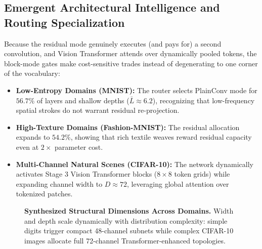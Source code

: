 \documentclass[11pt, a4paper]{article}
\begin{document}
\subsection{Emergent Architectural Intelligence and Routing Specialization}
\label{sec:emergent_intel}

Because the residual mode genuinely executes (and pays for) a second convolution, and Vision Transformer attends over dynamically pooled tokens, the block-mode gates make cost-sensitive trades instead of degenerating to one corner of the vocabulary:
\begin{itemize}
    \item \textbf{Low-Entropy Domains (MNIST):} The router selects PlainConv mode for $56.7\%$ of layers and shallow depths ($\bar{L} \approx 6.2$), recognizing that low-frequency spatial strokes do not warrant residual re-projection.
    \item \textbf{High-Texture Domains (Fashion-MNIST):} The residual allocation expands to $54.2\%$, showing that rich textile weaves reward residual capacity even at $2\times$ parameter cost.
    \item \textbf{Multi-Channel Natural Scenes (CIFAR-10):} The network dynamically activates Stage 3 Vision Transformer blocks ($8{\times}8$ token grids) while expanding channel width to $D \approx 72$, leveraging global attention over tokenized patches.
\end{itemize}

\begin{figure}[t]
\centering
{}
\caption{\textbf{Synthesized Structural Dimensions Across Domains.} Width and depth scale dynamically with distribution complexity: simple digits trigger compact 48-channel subnets while complex CIFAR-10 images allocate full 72-channel Transformer-enhanced topologies.}
\label{fig:routing_analysis}
\end{figure}
\end{document}

